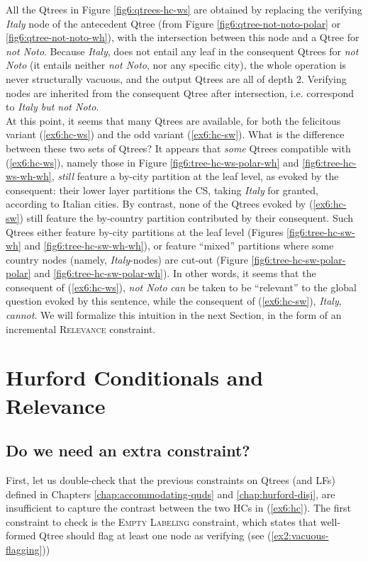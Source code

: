 All the Qtrees in Figure \ref{fig6:qtrees-hc-ws} are obtained by replacing the verifying \textit{Italy} node of the antecedent Qtree (from Figure \ref{fig6:qtree-not-noto-polar} or \ref{fig6:qtree-not-noto-wh}), with the intersection between this node and a Qtree for \textit{\textit{not Noto}}. Because \textit{Italy}, does not entail any leaf in the consequent Qtrees for \textit{not Noto} (it entails neither \textit{not Noto}, nor any specific city), the whole operation is never structurally vacuous, and the output Qtrees are all of depth $2$. Verifying nodes are inherited from the consequent Qtree after intersection, i.e. correspond to \textit{Italy but not Noto}.\\



At this point, it seems that many Qtrees are available, for both the felicitous variant (\ref{ex6:hc-ws}) and the odd variant (\ref{ex6:hc-sw}). What is the difference between these two sets of Qtrees? It appears that \textit{some} Qtrees compatible with (\ref{ex6:hc-ws}), namely those in Figure \ref{fig6:tree-hc-ws-polar-wh} and \ref{fig6:tree-hc-ws-wh-wh},  \textit{still} feature a by-city partition at the leaf level, as evoked by the consequent: their lower layer partitions the CS, taking \textit{Italy} for granted, according to Italian cities. By contrast, none of the Qtrees evoked by (\ref{ex6:hc-sw}) still feature the by-country partition contributed by their consequent. Such Qtrees either feature by-city partitions at the leaf level (Figures \ref{fig6:tree-hc-sw-wh} and \ref{fig6:tree-hc-sw-wh-wh}), or feature ``mixed'' partitions where some country nodes (namely, \textit{Italy}-nodes) are cut-out (Figure \ref{fig6:tree-hc-sw-polar-polar} and \ref{fig6:tree-hc-sw-polar-wh}). In other words, it seems that the consequent of (\ref{ex6:hc-ws}), \textit{not Noto} \textit{can} be taken to be ``relevant'' to the global question evoked by this sentence, while the consequent of (\ref{ex6:hc-sw}), \textit{Italy}, \textit{cannot}. We will formalize this intuition in the next Section, in the form of an incremental \textsc{Relevance} constraint.


\section{Hurford Conditionals and Relevance}
\subsection{Do we need an extra constraint?}
First, let us double-check that the previous constraints on Qtrees (and LFs) defined in Chapters \ref{chap:accommodating-quds} and \ref{chap:hurford-disj}, are insufficient to capture the contrast between the two HCs in (\ref{ex6:hc}). The first constraint to check is the \textsc{Empty Labeling} constraint, which states that well-formed Qtree should flag at least one node as verifying (see (\ref{ex2:vacuous-flagging}))

